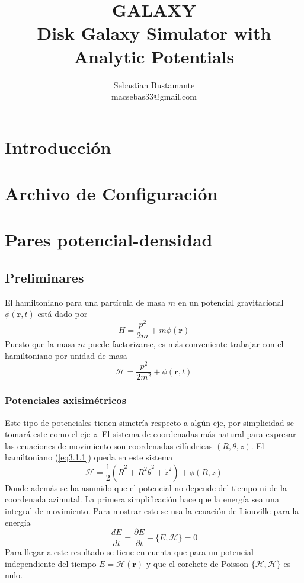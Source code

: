 \documentclass[10pt]{article}
\newcommand{\der}[2]{ \frac{ \partial #1 }{\partial #2} }
\newcommand{\dtot}[2]{ \frac{ d #1 }{d #2} }
\newcommand{\pr}[1]{ \left( #1 \right) }
\newcommand{\eq}[2]{\begin{equation} \label{eq#1} #2 \end{equation}}
\newcommand{\bds}[1]{\boldsymbol{ #1 }}
\begin{document}
\title{GALAXY \\ Disk Galaxy Simulator with Analytic Potentials  }
\author{Sebastian Bustamante \\ \small{macsebas33@gmail.com} }
\maketitle

\tableofcontents


\section{Introducción}

\section{Archivo de Configuración}

\section{Pares potencial-densidad}

\subsection{Preliminares}

El hamiltoniano para una partícula de masa $m$ en un potencial gravitacional $\phi(\textbf{r},t)$ está dado por
\[ H = \frac{p^2}{2m} + m\phi(\bds r) \]
Puesto que la masa $m$ puede factorizarse, es más conveniente trabajar con el hamiltoniano por unidad de masa
\eq{3.1.1}
{ \mathcal H = \frac{p^2}{2m^2} + \phi(\bds r,t) }

\subsubsection*{Potenciales axisimétricos}
Este tipo de potenciales tienen simetría respecto a algún eje, por simplicidad se tomará este como el eje $z$. El sistema de coordenadas más natural para expresar las ecuaciones de movimiento son coordenadas cilíndricas $(R,\theta,z)$. El hamiltoniano (\ref{eq3.1.1}) queda en este sistema
\[ \mathcal H = \frac{1}{2}\pr{\dot R^2 + R^2 \dot \theta^2 + \dot z^2} + \phi(R,z) \]
Donde además se ha asumido que el potencial no depende del tiempo ni de la coordenada azimutal. La primera simplificación hace que la energía sea una integral de movimiento. Para mostrar esto se usa la ecuación de Liouville para la energía
\[ \dtot{E}{t} = \der{E}{t} - \{ E, \mathcal H \} = 0 \]
Para llegar a este resultado se tiene en cuenta que para un potencial independiente del tiempo $E = \mathcal H( \bds r)$ y que el corchete de Poisson $\{\mathcal H, \mathcal H \}$ es nulo.
\end{document}
